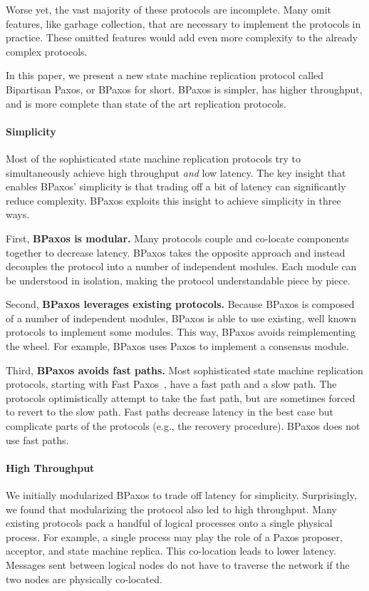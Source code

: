 Worse yet, the vast majority of these protocols are incomplete. Many omit
features, like garbage collection, that are necessary to implement the
protocols in practice. These omitted features would add even more complexity to
the already complex protocols.

In this paper, we present a new state machine replication protocol called
Bipartisan Paxos, or BPaxos for short. BPaxos is simpler, has higher
throughput, and is more complete than state of the art replication protocols.

\paragraph{Simplicity}
Most of the sophisticated state machine replication protocols try to
simultaneously achieve high throughput \emph{and} low latency. The key insight
that enables BPaxos' simplicity is that trading off a bit of latency can
significantly reduce complexity. BPaxos exploits this insight to achieve
simplicity in three ways.

First, \textbf{BPaxos is modular.} Many protocols couple and co-locate
components together to decrease latency. BPaxos takes the opposite approach and
instead decouples the protocol into a number of independent modules. Each
module can be understood in isolation, making the protocol understandable piece
by piece.

Second, \textbf{BPaxos leverages existing protocols.} Because BPaxos is
composed of a number of independent modules, BPaxos is able to use existing,
well known protocols to implement some modules. This way, BPaxos avoids
reimplementing the wheel. For example, BPaxos uses Paxos to implement a
consensus module.

Third, \textbf{BPaxos avoids fast paths.} Most sophisticated state machine
replication protocols, starting with Fast Paxos~\cite{lamport2006fast}, have a
fast path and a slow path. The protocols optimistically attempt to take the
fast path, but are sometimes forced to revert to the slow path.  Fast paths
decrease latency in the best case but complicate parts of the protocols (e.g.,
the recovery procedure). BPaxos does not use fast paths.

\paragraph{High Throughput}
We initially modularized BPaxos to trade off latency for simplicity.
Surprisingly, we found that modularizing the protocol also led to high
throughput. Many existing protocols pack a handful of logical processes onto a
single physical process. For example, a single process may play the role of a
Paxos proposer, acceptor, and state machine replica. This co-location leads to
lower latency. Messages sent between logical nodes do not have to traverse the
network if the two nodes are physically co-located.


